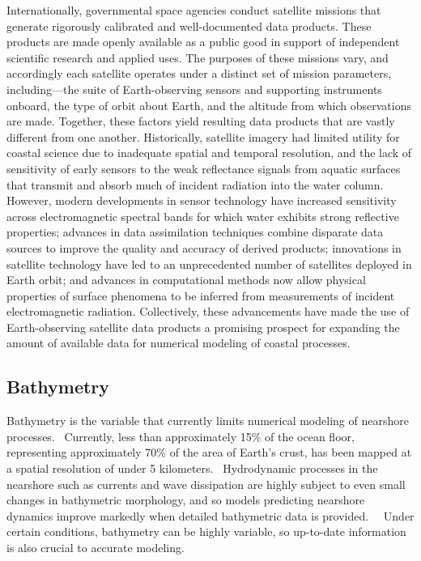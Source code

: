 \documentclass[12pt]{article}
\begin{document}
Internationally, governmental space agencies conduct satellite missions that generate rigorously calibrated and well-documented data products. These products are made openly available as a public good in support of independent scientific research and applied uses. The purposes of these missions vary, and accordingly each satellite operates under a distinct set of mission parameters, including---the suite of Earth-observing sensors and supporting instruments onboard, the type of orbit about Earth, and the altitude from which observations are made. Together, these factors yield resulting data products that are vastly different from one another. Historically, satellite imagery had limited utility for coastal science due to inadequate spatial and temporal resolution, and the lack of sensitivity of early sensors to the weak reflectance signals from aquatic surfaces that transmit and absorb much of incident radiation into the water column. However, modern developments in sensor technology have increased sensitivity across electromagnetic spectral bands for which water exhibits strong reflective properties; advances in data assimilation techniques combine disparate data sources to improve the quality and accuracy of derived products; innovations in satellite technology have led to an unprecedented number of satellites deployed in Earth orbit; and advances in computational methods now allow physical properties of surface phenomena to be inferred from measurements of incident electromagnetic radiation. Collectively, these advancements have made the use of Earth-observing satellite data products a promising prospect for expanding the amount of available data for numerical modeling of coastal processes.

\subsection{Bathymetry}
Bathymetry is the variable that currently limits numerical modeling of nearshore processes.~\cite{Holman2013, VanDongeren2008} Currently, less than approximately 15\% of the ocean floor, representing approximately 70\% of the area of Earth's crust, has been mapped at a spatial resolution of under 5 kilometers.~\cite{Baumann2019} Hydrodynamic processes in the nearshore such as currents and wave dissipation are highly subject to even small changes in bathymetric morphology, and so models predicting nearshore dynamics improve markedly when detailed bathymetric data is provided.~\cite{Ruessink2001}~\cite{VanDongeren2008} Under certain conditions, bathymetry can be highly variable, so up-to-date information is also crucial to accurate modeling.~\cite{VanDongeren2008}
\end{document}
